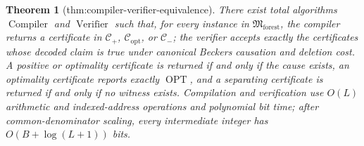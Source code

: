 \documentclass{article}
\newtheorem{theorem}{Theorem}
\begin{document}
\begin{theorem}[thm:compiler-verifier-equivalence]\label{thm:compiler-verifier-equivalence}
There exist total algorithms \(\operatorname{Compiler}\) and \(\operatorname{Verifier}\) such that, for every instance in \(\mathfrak M_{\mathrm{forest}}\), the compiler returns a certificate in \(\mathcal C_{+}\), \(\mathcal C_{\mathrm{opt}}\), or \(\mathcal C_{-}\); the verifier accepts exactly the certificates whose decoded claim is true under canonical Beckers causation and deletion cost. A positive or optimality certificate is returned if and only if the cause exists, an optimality certificate reports exactly \(\operatorname{OPT}\), and a separating certificate is returned if and only if no witness exists. Compilation and verification use \(O(L)\) arithmetic and indexed-address operations and polynomial bit time; after common-denominator scaling, every intermediate integer has \(O(B+\log(L+1))\) bits.
\end{theorem}
\end{document}
